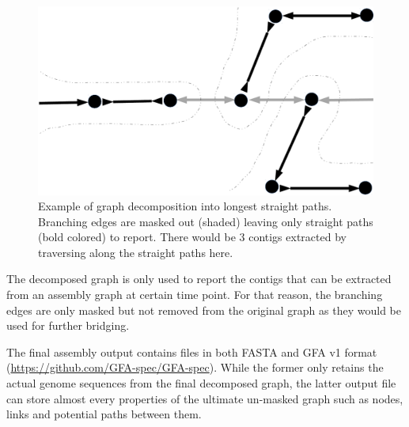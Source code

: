 \begin{figure}[!hpt]
\centering
\includegraphics[width=.6\textwidth]{images/decompose.pdf}
\caption[Example of graph decomposition into longest straight paths]{Example of graph decomposition into longest straight paths. Branching edges are masked out (shaded) leaving only straight paths (bold colored) to report. There would be 3 contigs extracted by traversing along the straight paths here.}
\label{figure:npgraph_decompose}
\end{figure}
The decomposed graph is only used to report the contigs that can be extracted from an assembly graph at certain time point. For that reason, the branching edges are only masked but not removed from the original graph as they would be used for further bridging.

The final assembly output contains files in both FASTA and GFA v1 format (\url{https://github.com/GFA-spec/GFA-spec}). While the former only retains the actual genome sequences from the final decomposed graph, the latter output file can store almost every properties of the ultimate un-masked graph such as nodes, links and potential paths between them.
